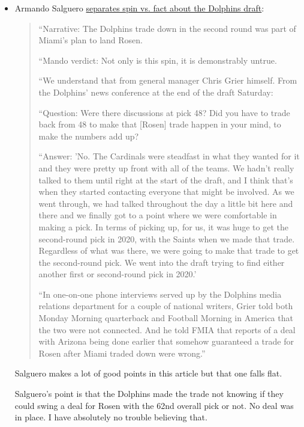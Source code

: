 \documentclass[11pt]{article}
\author{Tom Shannon}
\date{\today}
\title{}
\begin{document}
\begin{itemize}
\item Armando Salguero \href{https://www.miamiherald.com/sports/spt-columns-blogs/armando-salguero/article229939589.html}{separates spin vs. fact about the Dolphins draft}:

\begin{quote}
  ``Narrative: The Dolphins trade down in the second round was part of Miami’s plan to land Rosen.

``Mando verdict: Not only is this spin, it is demonstrably untrue.

``We understand that from general manager Chris Grier himself. From the Dolphins’ news conference at the end of the draft Saturday:

``Question: Were there discussions at pick 48? Did you have to trade back from 48 to make that [Rosen] trade happen in your mind, to make the numbers add up?

``Answer: 'No. The Cardinals were steadfast in what they wanted for it and they were pretty up front with all of the teams. We hadn’t really talked to them until right at the start of the draft, and I think that’s when they started contacting everyone that might be involved. As we went through, we had talked throughout the day a little bit here and there and we finally got to a point where we were comfortable in making a pick. In terms of picking up, for us, it was huge to get the second-round pick in 2020, with the Saints when we made that trade. Regardless of what was there, we were going to make that trade to get the second-round pick. We went into the draft trying to find either another first or second-round pick in 2020.'

``In one-on-one phone interviews served up by the Dolphins media relations department for a couple of national writers, Grier told both Monday Morning quarterback and Football Morning in America that the two were not connected. And he told FMIA that reports of a deal with Arizona being done earlier that somehow guaranteed a trade for Rosen after Miami traded down were wrong.''
\end{quote}

Salguero makes a lot of good points in this article but that one falls flat.

Salguero's point is that the Dolphins made the trade not knowing if they could swing a deal for Rosen with the 62nd overall pick or not.  No deal was in place.  I have absolutely no trouble believing that.


\end{itemize}
\end{document}

